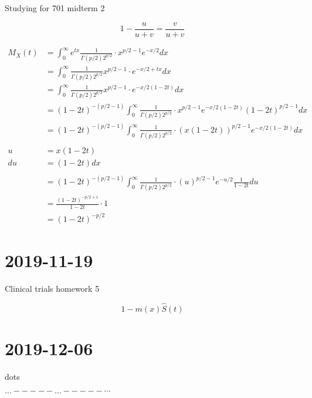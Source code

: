 \documentclass[]{article}
\begin{document}
Studying for 701 midterm 2

$$
1 - \frac{ u }{ u+v } = \frac{ v }{ u+v }
$$



\begin{align*}
	M_X(t) & = \int_{0} ^{\infty} e^{t x} \frac{ 1 }{ \Gamma(p/2) 2^{p/2}} \cdot  x^{p/2-1}  e^{-x/2} dx\\
		& = \int_{0} ^{\infty} \frac{ 1 }{ \Gamma(p/2) 2^{p/2}}  x^{p/2-1} \cdot e^{-x/2 + tx} dx\\
		& = \int_{0} ^{\infty} \frac{ 1 }{ \Gamma(p/2) 2^{p/2}}  x^{p/2-1} \cdot e^{-x/2 (1-2t)} dx\\
		& = (1-2t)^{-(p/2-1)}  \int_{0} ^{\infty} \frac{ 1 }{ \Gamma(p/2) 2^{p/2}} \cdot x^{p/2-1}  e^{-x/2 (1-2t)}  (1-2t)^{p/2-1} dx\\
		& = (1-2t)^{-(p/2-1)}  \int_{0} ^{\infty} \frac{ 1 }{ \Gamma(p/2) 2^{p/2}} \cdot (x (1-2t))^{p/2-1}  e^{-x/2 (1-2t)}  dx\\ \\
		u & = x(1-2t) \\
		du & = (1-2t) dx \\ \\
		& = (1-2t)^{-(p/2-1)}  \int_{0} ^{\infty} \frac{ 1 }{ \Gamma(p/2) 2^{p/2}} \cdot (u)^{p/2-1}  e^{-u/2 } \frac{ 1 }{ 1-2t }  du\\ 
		& = \frac{ (1-2t)^{-p/2 + 1} }{ 1-2t } \cdot 1 \\
		& = (1-2t)^{-p/2}
\end{align*}




\section*{2019-11-19}
Clinical trials homework 5

$$
1-m(x)    \hat{S}(t)
$$



\section*{2019-12-06}
dots

$\dots - - - - - \hdots - - - - - \cdots$
\end{document}
